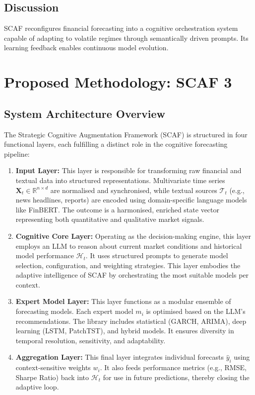 \documentclass[conference]{IEEEtran}
\begin{document}
\subsection{Discussion}
SCAF reconfigures financial forecasting into a cognitive orchestration system capable of adapting to volatile regimes through semantically driven prompts. Its learning feedback enables continuous model evolution.
\section{Proposed Methodology: SCAF 3}

\subsection{System Architecture Overview}
The Strategic Cognitive Augmentation Framework (SCAF) is structured in four functional layers, each fulfilling a distinct role in the cognitive forecasting pipeline:
\begin{enumerate}
    \item \textbf{Input Layer:} This layer is responsible for transforming raw financial and textual data into structured representations. Multivariate time series $\mathbf{X}_t \in \mathbb{R}^{n \times d}$ are normalised and synchronised, while textual sources $\mathcal{T}_t$ (e.g., news headlines, reports) are encoded using domain-specific language models like FinBERT. The outcome is a harmonised, enriched state vector representing both quantitative and qualitative market signals.

    \item \textbf{Cognitive Core Layer:} Operating as the decision-making engine, this layer employs an LLM to reason about current market conditions and historical model performance $\mathcal{H}_t$. It uses structured prompts to generate model selection, configuration, and weighting strategies. This layer embodies the adaptive intelligence of SCAF by orchestrating the most suitable models per context.

    \item \textbf{Expert Model Layer:} This layer functions as a modular ensemble of forecasting models. Each expert model $m_i$ is optimised based on the LLM's recommendations. The library includes statistical (GARCH, ARIMA), deep learning (LSTM, PatchTST), and hybrid models. It ensures diversity in temporal resolution, sensitivity, and adaptability.

    \item \textbf{Aggregation Layer:} This final layer integrates individual forecasts $\hat{y}_i$ using context-sensitive weights $w_i$. It also feeds performance metrics (e.g., RMSE, Sharpe Ratio) back into $\mathcal{H}_t$ for use in future predictions, thereby closing the adaptive loop.
\end{enumerate}
\end{document}
